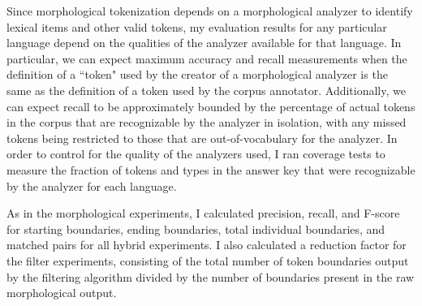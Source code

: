 Since morphological tokenization depends on a morphological analyzer to identify lexical items and other valid tokens, my evaluation results for any particular language depend on the qualities of the analyzer available for that language. In particular, we can expect maximum accuracy and recall measurements when the definition of a ``token" used by the creator of a morphological analyzer is the same as the definition of a token used by the corpus annotator. Additionally, we can expect recall to be approximately bounded by the percentage of actual tokens in the corpus that are recognizable by the analyzer in isolation, with any missed tokens being restricted to those that are out-of-vocabulary for the analyzer.
In order to control for the quality of the analyzers used, I ran coverage tests to measure the fraction of tokens and types in the answer key that were recognizable by the analyzer for each language.

As in the morphological experiments, I calculated precision, recall, and F-score for starting boundaries, ending boundaries, total individual boundaries, and matched pairs for all hybrid experiments. I also calculated a reduction factor for the filter experiments, consisting of the total number of token boundaries output by the filtering algorithm divided by the number of boundaries present in the raw morphological output.